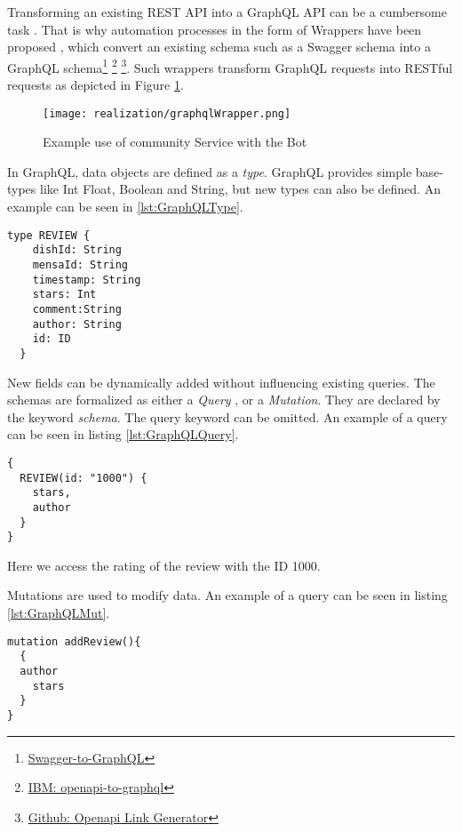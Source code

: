 Transforming an existing REST API into a GraphQL API can be a cumbersome task \cite{WCL18}. That is why automation processes in the form of Wrappers have been proposed \cite{KKK20}, which convert an existing schema such as a Swagger schema into a GraphQL schema\footnote{\href{https://github.com/yarax/swagger-to-graphql}{Swagger-to-GraphQL}} \footnote{\href{https://github.com/IBM/openapi-to-graphql}{IBM: openapi-to-graphql}} \footnote{\href{https://github.com/rwth-acis/openapi-link-generator}{Github: Openapi Link Generator}}.   Such wrappers transform GraphQL requests into RESTful requests as depicted in Figure \ref{fig:graphqlWrapper}.
\begin{figure}[h]
    \centering
    \texttt{[image: realization/graphqlWrapper.png]}
    \caption{Example use of community Service with the Bot}
    \label{fig:graphqlWrapper}
\end{figure}

In GraphQL, data objects are defined as a \emph{type}. GraphQL provides simple base-types like Int Float, Boolean and String, but new types can also be defined. An example can be seen in \ref{lst:GraphQLType}.
\begin{lstlisting}[caption={Example of a GraphQL schema},captionpos=b,label={lst:GraphQLType}]
  type REVIEW { 
    dishId: String 
    mensaId: String 
    timestamp: String 
    stars: Int 
    comment:String
    author: String 
    id: ID 
  }
\end{lstlisting}
New fields can be dynamically added without influencing existing queries. The schemas are formalized as either a \emph{Query }, or a \emph{Mutation}. They are declared by the keyword \emph{schema}. The query keyword can be omitted. An example of a query can be seen in listing \ref{lst:GraphQLQuery}.
\begin{lstlisting}[caption={Example of a GraphQL Query},captionpos=b,label={lst:GraphQLQuery}]
{
  REVIEW(id: "1000") {
    stars,
    author
  }
}
\end{lstlisting}
Here we access the rating of the review with the ID 1000.

Mutations are used to modify data. An example of a query can be seen in listing \ref{lst:GraphQLMut}.
\begin{lstlisting}[caption={Example of a GraphQL Mutation},captionpos=b,label={lst:GraphQLMut}]
mutation addReview(){
  {
  author
	stars 
  }
}
\end{lstlisting}
